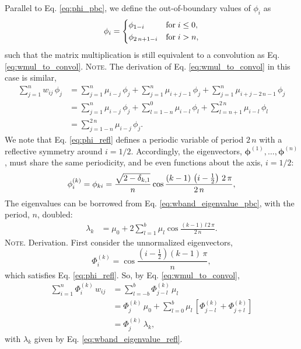 \documentclass[reprint, superscriptaddress, floatfix]{revtex4-1}
\newcommand{\note}[1]{{\color{DarkGreen}\footnotesize \textsc{Note.} #1}}
\begin{document}
Parallel to Eq. \eqref{eq:phi_pbc},
we define the out-of-boundary values
of $\phi_i$ as
%
\begin{equation}
  \phi_i
  =
  \begin{dcases}
    \phi_{ 1 - i }           & \mathrm{for \;} i \le 0, \\
    \phi_{ 2 \, n + 1 - i }  & \mathrm{for \;} i > n,
  \end{dcases}
\label{eq:phi_refl}
\end{equation}
%
such that the matrix multiplication is still equivalent to
a convolution as Eq. \eqref{eq:wmul_to_convol}.
%
\note{The derivation of Eq. \eqref{eq:wmul_to_convol}
  in this case is similar,
  $$
  \begin{aligned}
    \sum_{j = 1}^n w_{ij} \, \phi_j
    &=
    \sum_{j = 1}^n
      \mu_{i - j} \, \phi_j
    +
    \sum_{j = 1}^n
      \mu_{i + j - 1} \, \phi_j
    +
    \sum_{j = 1}^n
      \mu_{i + j - 2 \, n - 1} \, \phi_j
    \\
    &=
    \sum_{j = 1}^n
      \mu_{i - j} \, \phi_j
    +
    \sum_{l = 1 - n}^0
      \mu_{i - l} \, \phi_l
    +
    \sum_{l = n + 1}^{ 2 \, n }
      \mu_{i - l} \, \phi_l
    \\
    &=
    \sum_{j = 1 - n}^{ 2 \, n}
      \mu_{i - j} \, \phi_j.
  \end{aligned}
  $$
}%
We note that Eq. \eqref{eq:phi_refl}
defines a periodic variable of period $2 \, n$
with a reflective symmetry around $i = 1/2$.
%
Accordingly, the eigenvectors,
$\pmb\phi^{(1)}, \dots, \pmb\phi^{(n)}$,
must share the same periodicity,
and be even functions about the axis, $i = 1/2$:
%
\begin{equation}
  \phi^{(k)}_i
  =
  \phi_{k i}
  =
  \frac{ \sqrt{ 2 - \delta_{k, 1} } }
       {             n              }
  \cos \frac{ ( k - 1) \, \left( i - \frac 1 2 \right) \, 2 \, \pi}
            {                    2 \, n                           }
  ,
\notag
\end{equation}
%
The eigenvalues can be borrowed from
Eq. \eqref{eq:wband_eigenvalue_pbc},
with the period, $n$, doubled:
%
\begin{align}
  \lambda_k
  &=
  \mu_0
  +
  2
  \sum_{l = 1}^b
    \mu_l
    \cos \frac{(k - 1)  \, l \, 2 \, \pi}{ 2 \, n }
  .
\label{eq:wband_eigenvalue_refl}
\end{align}
%
\note{Derivation.
  First consider the unnormalized eigenvectors,
  $$
  \Phi^{(k)}_i
  =
  \cos \frac{ \left( i - \frac 1 2 \right) (k - 1) \, \pi}{n},
  $$
  which satisfies Eq. \eqref{eq:phi_refl}.
  So, by Eq. \eqref{eq:wmul_to_convol},
  $$
  \begin{aligned}
  \sum_{i = 1}^n
    \Phi^{(k)}_i \, w_{ij}
  &=
  \sum_{l = -b}^b
    \Phi^{(k)}_{j - l} \, \mu_l
  \\
  &=
    \Phi^{(k)}_j \, \mu_0
  + \sum_{l=0}^{b}
    \mu_l \,
    \left[
      \Phi^{(k)}_{j-l}
      +
      \Phi^{(k)}_{j+l}
    \right]
  \\
  &= \Phi^{(k)}_j \, \lambda_k,
  \end{aligned}
  $$
  with $\lambda_k$ given by Eq. \eqref{eq:wband_eigenvalue_refl}.
}%
\end{document}
